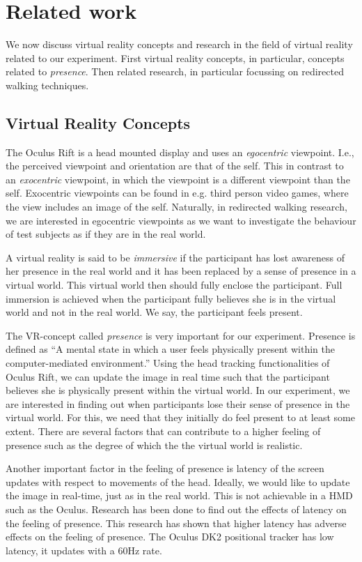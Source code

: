 \section{Related work}
We now discuss virtual reality concepts and research in the field of virtual reality related to our experiment.
First virtual reality concepts, in particular, concepts related to \textit{presence}.
Then related research, in particular focussing on redirected walking techniques.

\subsection{Virtual Reality Concepts}\label{sec:concepts}
The Oculus Rift is a head mounted display and uses an \textit{egocentric} viewpoint. 
I.e., the perceived viewpoint and orientation are that of the self.
This in contrast to an \textit{exocentric} viewpoint, in which the viewpoint is a different viewpoint than the self.
Exocentric viewpoints can be found in e.g. third person video games, where the view includes an image of the self.
Naturally, in redirected walking research, we are interested in egocentric viewpoints as we want to investigate the behaviour of test subjects as if they are in the real world.

A virtual reality is said to be \textit{immersive} if the participant has lost awareness of her presence in the real world and it has been replaced by a sense of presence in a virtual world. 
This virtual world then should fully enclose the participant.
Full immersion is achieved when the participant fully believes she is in the virtual world and not in the real world.
We say, the participant feels present.

The VR-concept called \textit{presence} is very important for our experiment.
Presence is defined as ``A mental state in which a user feels physically present within the computer-mediated environment.''
Using the head tracking functionalities of Oculus Rift, we can update the image in real time such that the participant believes she is physically present within the virtual world.
In our experiment, we are interested in finding out when participants lose their sense of presence in the virtual world. 
For this, we need that they initially do feel present to at least some extent.
There are several factors that can contribute to a higher feeling of presence such as the degree of which the the virtual world is realistic.

Another important factor in the feeling of presence is latency of the screen updates with respect to movements of the head.
Ideally, we would like to update the image in real-time, just as in the real world. 
This is not achievable in a HMD such as the Oculus. 
Research has been done to find out the effects of latency on the feeling of presence.\cite{meehan}
This research has shown that higher latency has adverse effects on the feeling of presence.
The Oculus DK2 positional tracker has low latency, it updates with a 60Hz rate.

